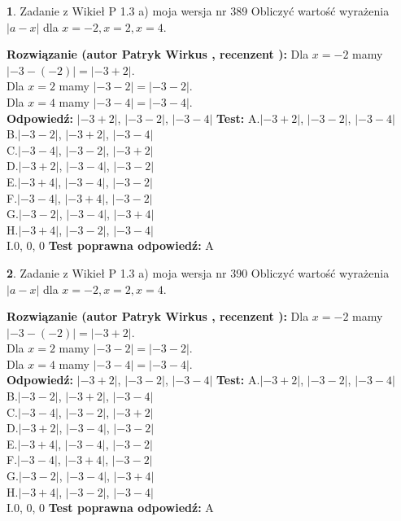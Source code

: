 \documentclass[12pt, a4paper]{article}
\theoremstyle{definition} %
\newtheorem{zad}{}
\newcommand{\zadStart}[1]{\begin{zad}#1\newline}
\newcommand{\zadStop}{\end{zad}}
\newcommand{\rozwStart}[2]{\noindent \textbf{Rozwiązanie (autor #1 , recenzent #2): }\newline}
\newcommand{\rozwStop}{\newline}
\newcommand{\odpStart}{\noindent \textbf{Odpowiedź:}\newline}
\newcommand{\odpStop}{\newline}
\newcommand{\testStart}{\noindent \textbf{Test:}\newline}
\newcommand{\testStop}{\newline}
\newcommand{\kluczStart}{\noindent \textbf{Test poprawna odpowiedź:}\newline}
\newcommand{\kluczStop}{\newline}
\begin{document}
\zadStart{Zadanie z Wikieł P 1.3 a) moja wersja nr 389}
Obliczyć wartość wyrażenia $|a - x|$ dla $x=-2,x=2,x=4$.
\zadStop
\rozwStart{Patryk Wirkus}{}
Dla $x = -2$ mamy $|-3 - (-2)| = |-3 + 2|$.\\
Dla $x = 2$ mamy $|-3 - 2| = |-3 - 2|$.\\
Dla $x = 4$ mamy $|-3 - 4| = |-3 - 4|$.\\
\rozwStop
\odpStart
$|-3 + 2|$, $|-3 - 2|$, $|-3 - 4|$
\odpStop
\testStart
A.$|-3 + 2|$, $|-3 - 2|$, $|-3 - 4|$\\
B.$|-3 - 2|$, $|-3 + 2|$, $|-3 - 4|$\\
C.$|-3 - 4|$, $|-3 - 2|$, $|-3 + 2|$\\
D.$|-3 + 2|$, $|-3 - 4|$, $|-3 - 2|$\\
E.$|-3 + 4|$, $|-3 - 4|$, $|-3 - 2|$\\
F.$|-3 - 4|$, $|-3 + 4|$, $|-3 - 2|$\\
G.$|-3 - 2|$, $|-3 - 4|$, $|-3 + 4|$\\
H.$|-3 + 4|$, $|-3 - 2|$, $|-3 - 4|$\\
I.$0$, $0$, $0$
\testStop
\kluczStart
A
\kluczStop



\zadStart{Zadanie z Wikieł P 1.3 a) moja wersja nr 390}
Obliczyć wartość wyrażenia $|a - x|$ dla $x=-2,x=2,x=4$.
\zadStop
\rozwStart{Patryk Wirkus}{}
Dla $x = -2$ mamy $|-3 - (-2)| = |-3 + 2|$.\\
Dla $x = 2$ mamy $|-3 - 2| = |-3 - 2|$.\\
Dla $x = 4$ mamy $|-3 - 4| = |-3 - 4|$.\\
\rozwStop
\odpStart
$|-3 + 2|$, $|-3 - 2|$, $|-3 - 4|$
\odpStop
\testStart
A.$|-3 + 2|$, $|-3 - 2|$, $|-3 - 4|$\\
B.$|-3 - 2|$, $|-3 + 2|$, $|-3 - 4|$\\
C.$|-3 - 4|$, $|-3 - 2|$, $|-3 + 2|$\\
D.$|-3 + 2|$, $|-3 - 4|$, $|-3 - 2|$\\
E.$|-3 + 4|$, $|-3 - 4|$, $|-3 - 2|$\\
F.$|-3 - 4|$, $|-3 + 4|$, $|-3 - 2|$\\
G.$|-3 - 2|$, $|-3 - 4|$, $|-3 + 4|$\\
H.$|-3 + 4|$, $|-3 - 2|$, $|-3 - 4|$\\
I.$0$, $0$, $0$
\testStop
\kluczStart
A
\kluczStop
\end{document}
